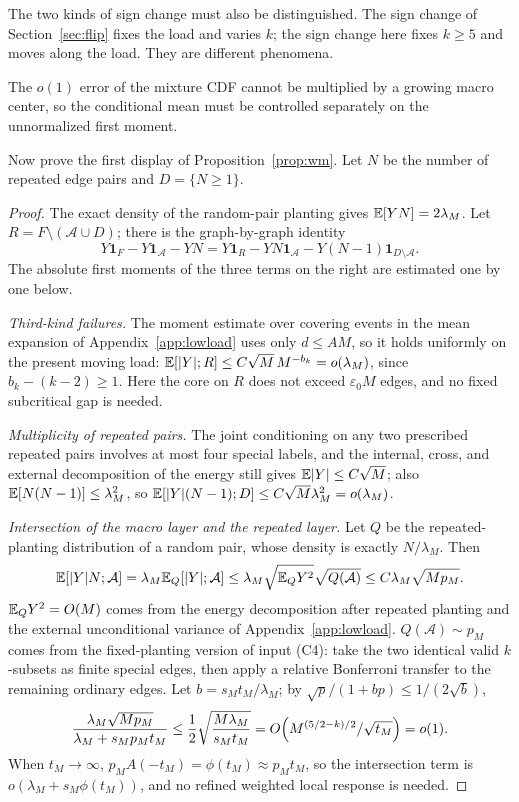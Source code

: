 The two kinds of sign change must also be distinguished. The sign change of Section~\ref{sec:flip}
fixes the load and varies $k$; the sign change here fixes $k\ge5$ and moves along the load. They
are different phenomena.

The $o(1)$ error of the mixture CDF cannot be multiplied by a growing macro center, so the
conditional mean must be controlled separately on the unnormalized first moment.

Now prove the first display of Proposition~\ref{prop:wm}. Let $N$ be the number of repeated edge
pairs and $D=\{N\ge1\}$.

\begin{proof}
The exact density of the random-pair planting gives $\mathbb E[YN]=2\lambda_M$. Let
$R=F\setminus(\mathcal A\cup D)$; there is the graph-by-graph identity
\begin{equation}
Y\mathbf1_F-Y\mathbf1_{\mathcal A}-YN=Y\mathbf1_R-YN\mathbf1_{\mathcal A}-Y(N-1)\mathbf1_{D\setminus \mathcal A}.\label{F:wm-id}
\end{equation}
The absolute first moments of the three terms on the right are estimated one by one below.

\emph{Third-kind failures.} The moment estimate over covering events in the mean expansion of
Appendix~\ref{app:lowload} uses only $d\le AM$, so it holds uniformly on the present moving load:
$\mathbb E[|Y|;R]\le C\sqrt M\,M^{-b_k}=o(\lambda_M)$, since $b_k-(k-2)\ge1$. Here the core on $R$ does
not exceed $\varepsilon_0M$ edges, and no fixed subcritical gap is needed.

\emph{Multiplicity of repeated pairs.} The joint conditioning on any two prescribed repeated pairs
involves at most four special labels, and the internal, cross, and external decomposition of the
energy still gives $\mathbb E|Y|\le C\sqrt M$; also $\mathbb E[N(N-1)]\le\lambda_M^2$, so
$\mathbb E[|Y|(N-1);D]\le C\sqrt M\lambda_M^2=o(\lambda_M)$.

\emph{Intersection of the macro layer and the repeated layer.} Let $Q$ be the repeated-planting
distribution of a random pair, whose density is exactly $N/\lambda_M$. Then
\[
\mathbb E[|Y|N;\mathcal A]=\lambda_M\mathbb E_Q[|Y|;\mathcal A]\le\lambda_M\sqrt{\mathbb E_QY^2}\sqrt{Q(\mathcal A)}\le C\lambda_M\sqrt{Mp_M}.
\]
$\mathbb E_QY^2=O(M)$ comes from the energy decomposition after repeated planting and the external
unconditional variance of Appendix~\ref{app:lowload}. $Q(\mathcal A)\sim p_M$ comes from the
fixed-planting version of input (C4): take the two identical valid $k$-subsets as finite special
edges, then apply a relative Bonferroni transfer to the remaining ordinary edges. Let
$b=s_Mt_M/\lambda_M$; by $\sqrt{p}/(1+bp)\le1/(2\sqrt b)$,
\[
\frac{\lambda_M\sqrt{Mp_M}}{\lambda_M+s_Mp_Mt_M}\le\frac12\sqrt{\frac{M\lambda_M}{s_Mt_M}}=O\Bigl(M^{(5/2-k)/2}/\sqrt{t_M}\Bigr)=o(1).
\]
When $t_M\to\infty$, $p_MA(-t_M)=\phi(t_M)\approx p_Mt_M$, so the intersection term is
$o(\lambda_M+s_M\phi(t_M))$, and no refined weighted local response is needed.


\end{proof}
